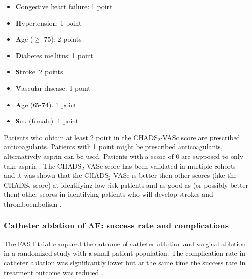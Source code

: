\documentclass[type=dr, dr=rernat, accentcolor=tud7b,colorbacktitle, bigchapter, openright, twoside, 12pt ]{tudthesis}
\begin{document}
\begin{itemize}
 \item [] \textbf{C}ongestive heart failure: 1 point
 \item [] \textbf{H}ypertension: 1 point
 \item [] \textbf{A}ge ($\geq$ 75): 2 points
 \item [] \textbf{D}iabetes mellitus: 1 point
 \item [] \textbf{S}troke: 2 points
 \item [] \textbf{V}ascular disease: 1 point
 \item [] \textbf{A}ge (65-74): 1 point
 \item [] \textbf{S}ex (female): 1 point
\end{itemize}

Patients who obtain at least 2 point in the CHADS$_{2}$-VASc score are prescribed anticoagulants. Patients with 1 point might be prescribed 
anticoagulants, alternatively asprin can be used. Patients with a score of 0 are supposed to only take asprin \cite{Fle}. The 
CHADS$_{2}$-VASc score has been validated in multiple cohorts \cite{Lip11} and it was shown that the CHADS$_{2}$-VASc is better then other 
scores (like the CHADS$_{2}$ score) at identifying low risk patients \cite{Pot12} \cite{Ole12} \cite{Van11} and as good as (or possibly 
better then) other scores in identifying patients who will develop strokes and thromboembolism \cite{Fri12} \cite{Ole11} \cite{Bor11}. 



\subsubsection*{Catheter ablation of AF: success rate and complications}

The FAST trial compared the outcome of catheter ablation and surgical ablation in a randomized study with a small patient population. 
The complication rate in catheter ablation was significantly lower but at the same time the success rate in treatment outcome was 
reduced \cite{Boe12}. \newline
\end{document}
